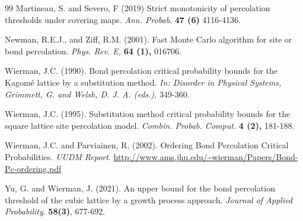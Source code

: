 \documentclass{aptpub}
\begin{document}
\begin{thebibliography}{99}
 {\sc Martineau, S. and Severo, F} (2019) Strict monotonicity of percolation thresholds under covering maps. {\em 
Ann. Probab}. {\bf 47 (6)}  4116-4136.


 {\sc Newman, R.E.J., and Ziff, R.M.}  (2001). Fast Monte Carlo algorithm for site or bond percolation. {\em Phys. Rev. E,} {\bf 64 (1),} 016706.

 {\sc Wierman, J.C.} (1990).  Bond percolation critical probability bounds for the Kagomé lattice by a substitution method. {\em In: Disorder in Physical Systems, Grimmett, G. and Welsh, D. J. A. (eds.),}
349-360. 

 {\sc Wierman, J.C.} (1995). Substitution method critical probability bounds for the square lattice site percolation model. {\em Combin. Probab. Comput.} {\bf 4 (2),} 181-188. 

 {\sc Wierman, J.C.  and Parviainen, R.}  (2002). Ordering Bond Percolation Critical Probabilities. {\em UUDM Report}.
\url{http://www.ams.jhu.edu/~wierman/Papers/Bond-Pc-ordering.pdf}

 {\sc Yu, G. and  Wierman, J.} (2021). An upper bound for the bond percolation threshold of the cubic lattice by a growth process approach. {\em Journal of Applied Probability}. {\bf 58(3)}, 677-692.




\end{thebibliography}
\end{document}
